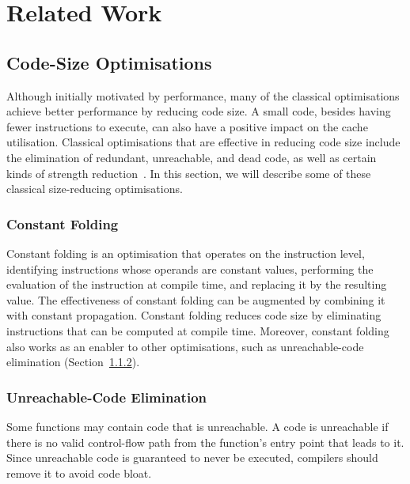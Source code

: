 \chapter{Related Work} \label{chp:relatedwork}

\section{Code-Size Optimisations} \label{sec:relatedwork:codesize}

Although initially motivated by performance, many of the classical optimisations achieve better performance by reducing code size.
A small code, besides having fewer instructions to execute, can also have a positive impact on the cache utilisation.
Classical optimisations that are effective in reducing code size include the elimination of redundant, unreachable, and dead code, as well as certain kinds of strength reduction~\cite{cocke70,briggs97,debray00}.
In this section, we will describe some of these classical size-reducing optimisations.

\subsection{Constant Folding} \label{sec:relatedwork:constfold}

Constant folding is an optimisation that operates on the instruction level, identifying instructions whose operands are constant values, performing the evaluation of the instruction at compile time, and replacing it by the resulting value.
The effectiveness of constant folding can be augmented by combining it with constant propagation.
Constant folding reduces code size by eliminating instructions that can be computed at compile time.
Moreover, constant folding also works as an enabler to other optimisations, such as unreachable-code elimination (Section~\ref{sec:relatedwork:unreachable}).
 
\subsection{Unreachable-Code Elimination} \label{sec:relatedwork:unreachable}

Some functions may contain code that is unreachable. A code is unreachable if there is no valid control-flow path from the function's entry point that leads to it.
Since unreachable code is guaranteed to never be executed, compilers should remove it to avoid code bloat.

